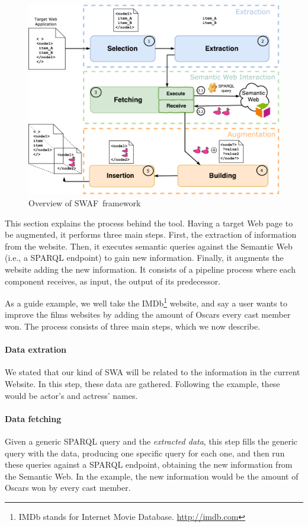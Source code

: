 \documentclass[runningheads]{llncs}
\newcommand{\SWAT}{SWAF}
\begin{document}
\begin{figure}
  \centering
    \includegraphics[width=0.80\linewidth]{SwatFmw2.pdf}
    \caption{Overview of \SWAT ~framework}
    \label{fig-framework}
\end{figure}

This section explains the process behind the tool. Having a target Web page to be augmented, it performs three main steps. First, the extraction of information from the website. Then, it executes semantic queries against the Semantic Web (i.e., a SPARQL endpoint) to gain new information. Finally, it augments the website adding the new information. It consists of a pipeline process where each component receives, as input, the output of its predecessor.

As a guide example, we well take the IMDb\footnote{IMDb stands for Internet Movie Database. \url{http://imdb.com}} website, and say a user wants to improve the films websites by adding the amount of Oscars every cast member won. The process consists of three main steps, which we now describe.

\paragraph{Data extration} We stated that our kind of SWA will be related to the information in the current Website. In this step, these data are gathered. Following the example, these would be actor's and actress' names.

\paragraph{Data fetching} Given a generic SPARQL query and the \textit{extracted data}, this step fills the generic query with the data, producing one specific query for each one, and then run these queries against a SPARQL endpoint, obtaining the new information from the Semantic Web. In the example, the new information would be the amount of Oscars won by every cast member.
\end{document}
